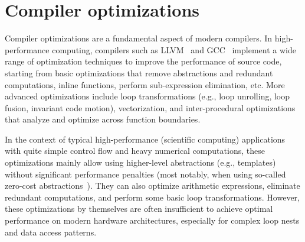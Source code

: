 \section{Compiler optimizations}\label{sec:compiler-optimizations}

Compiler optimizations are a fundamental aspect of modern compilers. In high-performance computing, compilers such as LLVM~\cite{lattner2004llvm} and GCC~\cite{gcc} implement a wide range of optimization techniques to improve the performance of source code, starting from basic optimizations that remove abstractions and redundant computations, inline functions, perform sub-expression elimination, etc. More advanced optimizations include loop transformations (e.g., loop unrolling, loop fusion, invariant code motion), vectorization, and inter-procedural optimizations that analyze and optimize across function boundaries.

In the context of typical high-performance (scientific computing) applications with quite simple control flow and heavy numerical computations, these optimizations mainly allow using higher-level abstractions (e.g., \cpp templates) without significant performance penalties (most notably, when using so-called zero-cost abstractions~\cite{stroustrup2012foundations}). They can also optimize arithmetic expressions, eliminate redundant computations, and perform some basic loop transformations. However, these optimizations by themselves are often insufficient to achieve optimal performance on modern hardware architectures, especially for complex loop nests and data access patterns.


